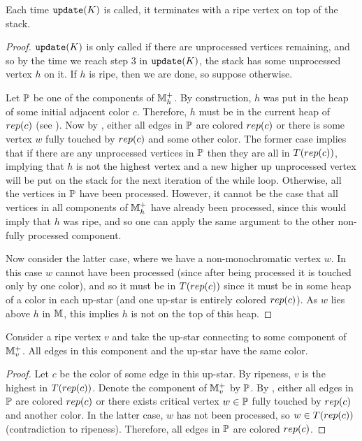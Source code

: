 \begin{corollary}
\label{cor:terminate}
 Each time ${\tt update}(K)$ is called, it terminates with a ripe vertex on top of the stack.
\end{corollary}
\begin{proof}
 ${\tt update}(K)$ is only called if there are unprocessed vertices remaining, and so by the time we reach step 3 in 
 ${\tt update}(K)$, the stack has some unprocessed vertex $h$ on it.  
 If $h$ is ripe, then we are done, so suppose otherwise.
 
 Let $\mathbb{P}$ be one of the components of $\mathbb{M}^+_h$.  By construction, $h$ was put in the heap of some initial 
 adjacent color $c$.  Therefore, $h$ must be in the current heap of $rep(c)$ (see ).  
 Now by , either all edges in $\mathbb{P}$ are colored $rep(c)$ or  
 there is some vertex $w$ fully touched by $rep(c)$ and some other color.  
 The former case implies that if there are any unprocessed vertices in $\mathbb{P}$ then they are all in $T(rep(c))$, 
 implying that $h$ is not the highest vertex and a new higher up unprocessed vertex will be put on the stack for the next iteration of the while loop.  
 Otherwise, all the vertices in $\mathbb{P}$ have been processed.  
 However, it cannot be the case that all vertices in all components of $\mathbb{M}^+_h$ have already been processed, 
 since this would imply that $h$ was ripe, and so one can apply the same argument to the other non-fully processed component. 
 
 Now consider the latter case, where we have a non-monochromatic vertex $w$.
 In this case $w$ cannot have been processed (since after being processed it is touched only by one color), 
 and so it must be in $T(rep(c))$ since it must be in some heap of a color in each up-star (and one up-star is entirely colored $rep(c)$).
 As $w$ lies above $h$ in $\mathbb{M}$, this implies $h$ is not on the top of this heap.
\end{proof}


\begin{claim} \label{clm:upstar} Consider a ripe vertex $v$ and take the up-star connecting
to some component of $\mathbb{M}^+_v$. All edges in this component and the up-star have the same color.
\end{claim}

\begin{proof} Let $c$ be the color of some edge in this up-star.
By ripeness, $v$ is the highest in $T(rep(c))$.
Denote the component of $\mathbb{M}^+_v$ by $\mathbb{P}$.
By , either all edges in $\mathbb{P}$ are colored $rep(c)$ or there exists critical vertex $w \in \mathbb{P}$
fully touched by $rep(c)$ and another color. In the latter case, $w$ has not been processed,
so $w \in T(rep(c))$ (contradiction to ripeness). Therefore, all edges in $\mathbb{P}$ are colored $rep(c)$.
\end{proof}


